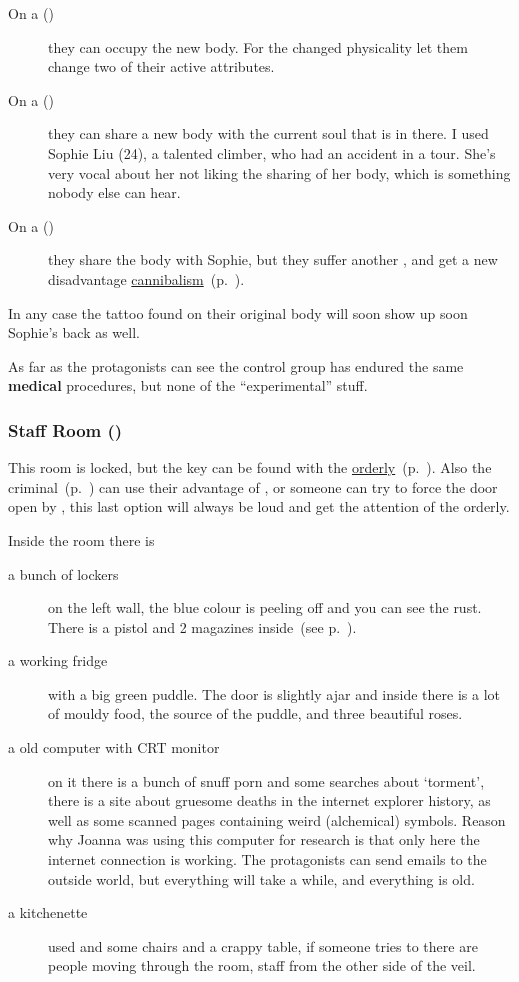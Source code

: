 \documentclass[bg-full]{resources/stylesheets/kult}
\begin{document}
\begin{description}
  \item[On a ()] they can occupy the new body.  For the changed physicality let them change two of their active
        attributes.
  \item[On a ()] they can share a new body with the current soul that is in there.  I used Sophie Liu (24), a
        talented climber, who had an accident in a tour.  She's very vocal about her not liking the sharing of her body, which is
        something nobody else can hear.
  \item[On a ()] they share the body with Sophie, but they suffer another , and get a new
        disadvantage \hyperref[disadv:cannibalism]{cannibalism}~(p.~\pageref{disadv:cannibalism}).
\end{description}

In any case the tattoo found on their original body will soon show up soon Sophie's back as well.

As far as the protagonists can see the control group has endured the same \textbf{medical} procedures, but none of the
“experimental” stuff.

\subsubsection{Staff Room (\faLock)}%
\label{ssub:staff_room}

This room is locked, but the key can be found with the \hyperref[ssub:orderly]{orderly}~(p.~\pageref{ssub:orderly}).  Also the
criminal~(p.~\pageref{sub:the_criminal}) can use their advantage of , or someone can try to force the door open
by , this last option will always be loud and get the attention of the orderly.

Inside the room there is
\begin{description}
  \item[a bunch of lockers] on the left wall, the blue colour is peeling off and you can see the rust.  There is a pistol and 2
        magazines inside~(see p.~\pageref{pistol}).
  \item[a working fridge] with a big green puddle.  The door is slightly ajar and inside there is a lot of mouldy food,
        the source of the puddle, and three beautiful roses.
  \item[a old computer with CRT monitor] on it there is a bunch of snuff porn and some searches about ‘torment’, there is a
        site about gruesome deaths in the internet explorer history, as well as some scanned pages containing weird (alchemical)
        symbols.  Reason why Joanna was using this computer for research is that only here the internet connection is working.  The
        protagonists can send emails to the outside world, but everything will take a while, and everything is old.
  \item[a kitchenette] used and some chairs and a crappy table, if someone tries to 
        there are people moving through the room, staff from the other side of the veil.
\end{description}
\end{document}
